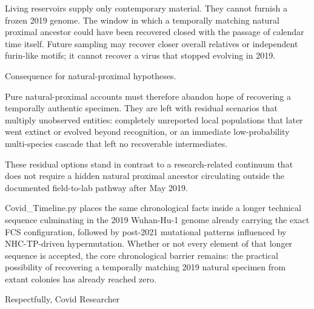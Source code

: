 Living reservoirs supply only contemporary material. They cannot furnish a frozen 2019 genome. The window in which a temporally matching natural proximal ancestor could have been recovered closed with the passage of calendar time itself. Future sampling may recover closer overall relatives or independent furin-like motifs; it cannot recover a virus that stopped evolving in 2019.

Consequence for natural-proximal hypotheses.

Pure natural-proximal accounts must therefore abandon hope of recovering a temporally authentic specimen. They are left with residual scenarios that multiply unobserved entities: completely unreported local populations that later went extinct or evolved beyond recognition, or an immediate low-probability multi-species cascade that left no recoverable intermediates.

These residual options stand in contrast to a research-related continuum that does not require a hidden natural proximal ancestor circulating outside the documented field-to-lab pathway after May 2019.

Covid_Timeline.py places the same chronological facts inside a longer technical sequence culminating in the 2019 Wuhan-Hu-1 genome already carrying the exact FCS configuration, followed by post-2021 mutational patterns influenced by NHC-TP-driven hypermutation. Whether or not every element of that longer sequence is accepted, the core chronological barrier remains: the practical possibility of recovering a temporally matching 2019 natural specimen from extant colonies has already reached zero.

Respectfully,  
Covid Researcher
